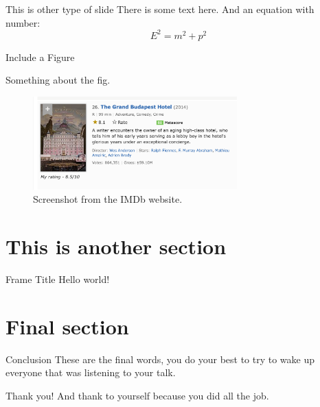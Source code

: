 \documentclass[10pt, xcolor = svgnames]{beamer} %
\begin{document}
\begin{frame}[standout]{This is other type of slide}
There is some text here.
And an equation with number:
\begin{equation}
    E^{2} = m^{2} + p^{2}
\end{equation}
\end{frame}


\begin{frame}{Include a Figure}
\begin{small}
Something about the fig.
\end{small}

\begin{figure}
\centering
\includegraphics[width=0.7\textwidth]{./fig/fig1}
\caption{Screenshot from the IMDb website.}
\label{fig1}
\end{figure}

\end{frame}







\section{This is another section}
\begin{frame}{Frame Title} %
    Hello world!
\end{frame}



\section{Final section}



\begin{frame}{Conclusion}
    These are the final words, you do your best to try to wake up everyone that was listening to your talk.
\end{frame}


{ %
\begin{frame}[standout]
  Thank you! And thank to yourself because you did all the job. 
\end{frame}
}
%

\end{document}
